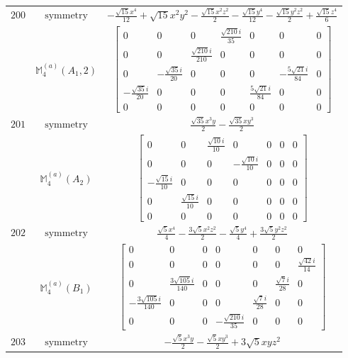 \documentclass[fleqn,8pt,landscape]{jsarticle}
\begin{document}
\begin{longtable}{ccc}
$ 200 $ & $ \text{symmetry} $ & $ - \frac{\sqrt{15} x^{4}}{12} + \sqrt{15} x^{2} y^{2} - \frac{\sqrt{15} x^{2} z^{2}}{2} - \frac{\sqrt{15} y^{4}}{12} - \frac{\sqrt{15} y^{2} z^{2}}{2} + \frac{\sqrt{15} z^{4}}{6} $ \\
$  $ & $ \mathbb{M}_{4}^{(a)}(A_{1},2) $ & $ \begin{bmatrix} 0 & 0 & 0 & \frac{\sqrt{210} i}{35} & 0 & 0 & 0 \\ 0 & 0 & \frac{\sqrt{210} i}{210} & 0 & 0 & 0 & 0 \\ 0 & - \frac{\sqrt{35} i}{20} & 0 & 0 & 0 & - \frac{5 \sqrt{21} i}{84} & 0 \\ - \frac{\sqrt{35} i}{20} & 0 & 0 & 0 & \frac{5 \sqrt{21} i}{84} & 0 & 0 \\ 0 & 0 & 0 & 0 & 0 & 0 & 0 \end{bmatrix} $ \\ \hline
$ 201 $ & $ \text{symmetry} $ & $ \frac{\sqrt{35} x^{3} y}{2} - \frac{\sqrt{35} x y^{3}}{2} $ \\
$  $ & $ \mathbb{M}_{4}^{(a)}(A_{2}) $ & $ \begin{bmatrix} 0 & 0 & \frac{\sqrt{10} i}{10} & 0 & 0 & 0 & 0 \\ 0 & 0 & 0 & - \frac{\sqrt{10} i}{10} & 0 & 0 & 0 \\ - \frac{\sqrt{15} i}{10} & 0 & 0 & 0 & 0 & 0 & 0 \\ 0 & \frac{\sqrt{15} i}{10} & 0 & 0 & 0 & 0 & 0 \\ 0 & 0 & 0 & 0 & 0 & 0 & 0 \end{bmatrix} $ \\ \hline
$ 202 $ & $ \text{symmetry} $ & $ \frac{\sqrt{5} x^{4}}{4} - \frac{3 \sqrt{5} x^{2} z^{2}}{2} - \frac{\sqrt{5} y^{4}}{4} + \frac{3 \sqrt{5} y^{2} z^{2}}{2} $ \\
$  $ & $ \mathbb{M}_{4}^{(a)}(B_{1}) $ & $ \begin{bmatrix} 0 & 0 & 0 & 0 & 0 & 0 & 0 \\ 0 & 0 & 0 & 0 & 0 & 0 & \frac{\sqrt{42} i}{14} \\ 0 & \frac{3 \sqrt{105} i}{140} & 0 & 0 & 0 & \frac{\sqrt{7} i}{28} & 0 \\ - \frac{3 \sqrt{105} i}{140} & 0 & 0 & 0 & \frac{\sqrt{7} i}{28} & 0 & 0 \\ 0 & 0 & 0 & - \frac{\sqrt{210} i}{35} & 0 & 0 & 0 \end{bmatrix} $ \\ \hline
$ 203 $ & $ \text{symmetry} $ & $ - \frac{\sqrt{5} x^{3} y}{2} - \frac{\sqrt{5} x y^{3}}{2} + 3 \sqrt{5} x y z^{2} $ \\

\end{longtable}
\end{document}
